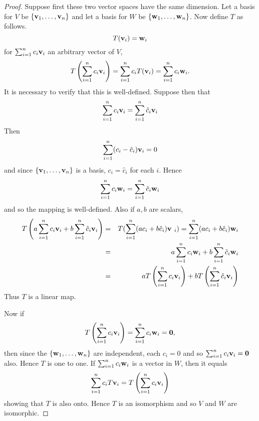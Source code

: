 \begin{proof}Suppose first these two vector spaces have the same
dimension. Let a basis for $V$ be $\left\{
\mbox{\bf v}_{1},\ldots,\mbox{\bf v}_{n}\right\} $ and let a basis for $W$ be $
\left\{\mbox{\bf w}_{1},\ldots,\mbox{\bf w}_{n}\right\}$. Now define $T$ as
follows.
\begin{equation*}
T(\mbox{\bf v}_{i})=\mbox{\bf w}_{i}
\end{equation*}
for $\sum_{i=1}^{n}c_{i}\mbox{\bf v}_{i}$ an arbitrary vector of $V$,%
\begin{equation*}
T\left(\sum_{i=1}^{n}c_{i}\mbox{\bf v}_{i}\right) = \sum_{i=1}^{n}c_{i}T
(\mbox{\bf v}_{i})=\sum_{i=1}^{n}c_{i}\mbox{\bf w}_{i}.
\end{equation*}
It is necessary to verify that this is well-defined. Suppose then that
\begin{equation*}
\sum_{i=1}^{n}c_{i}\mbox{\bf v}_{i}=\sum_{i=1}^{n}\hat{c}_{i}\mbox{\bf v}_{i}
\end{equation*}
Then
\begin{equation*}
\sum_{i=1}^{n}(c_{i}-\hat{c}_{i}) \mbox{\bf v}_{i}=0
\end{equation*}
and since $\left\{\mbox{\bf v}_{1},\ldots,\mbox{\bf v}_{n}\right\} $ is a basis, $
c_{i}=\hat{c}_{i}$ for each $i$. Hence
\begin{equation*}
\sum_{i=1}^{n}c_{i}\mbox{\bf w}_{i}=\sum_{i=1}^{n}\hat{c}_{i}\mbox{\bf w}_{i}
\end{equation*}
and so the mapping is well-defined. Also if $a,b$ are scalars,
\begin{eqnarray*}
T\left(a\sum_{i=1}^{n}c_{i}\mbox{\bf v}_{i}+b\sum_{i=1}^{n}\hat{c}_{i}\mbox{\bf v}
_{i}\right) &=&T(\sum_{i=1}^{n}(ac_{i}+b\hat{c}_{i}) \mbox{\bf v
}_{i}) =\sum_{i=1}^{n}(ac_{i}+b\hat{c}_{i}) \mbox{\bf w}_{i} \\
&=&a\sum_{i=1}^{n}c_{i}\mbox{\bf w}_{i}+b\sum_{i=1}^{n}\hat{c}_{i}\mbox{\bf w}_{i} \\
&=&aT\left(\sum_{i=1}^{n}c_{i}\mbox{\bf v}_{i}\right) +bT\left(\sum_{i=1}^{n}
\hat{c}_{i}\mbox{\bf v}_{i}\right)
\end{eqnarray*}
Thus $T$ is a linear map.

Now if
\begin{equation*}
T\left(\sum_{i=1}^{n}c_{i}\mbox{\bf v}_{i}\right) =\sum_{i=1}^{n}c_{i}\mbox{\bf w}
_{i}=\mbox{\bf 0},
\end{equation*}
then since the $\left\{\mbox{\bf w}_{1},\ldots,\mbox{\bf w}_{n}\right\} $ are
independent, each $c_{i}=0$ and so $\sum_{i=1}^{n}c_{i}\mbox{\bf v}_{i}=\mbox{\bf 0}$
also. Hence $T$ is one to one. If $\sum_{i=1}^{n}c_{i}\mbox{\bf w}_{i}$ is a
vector in $W$, then it equals
\begin{equation*}
\sum_{i=1}^{n}c_{i}T\mbox{\bf v}_{i}=T\left(\sum_{i=1}^{n}c_{i}\mbox{\bf v}_{i}\right)
\end{equation*}
showing that $T$ is also onto. Hence $T$ is an isomorphism and so $V$ and $W$
are isomorphic.


\end{proof}
